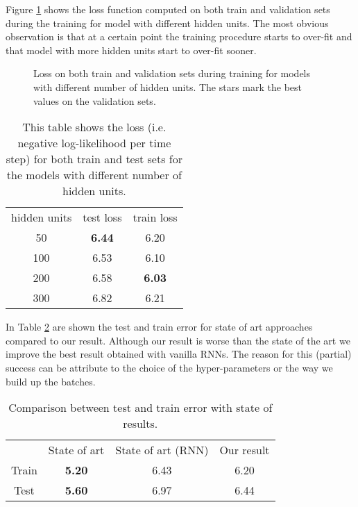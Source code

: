 Figure \ref{fig:overfitting_muse} shows the loss function computed on both train and validation sets during the training for model with different hidden units. The most obvious observation is that at a certain point the training procedure starts to over-fit and that model with more hidden units start to over-fit sooner.

\begin{figure}
	\centering
\resizebox{13cm}{!}{
	
}
\caption{Loss on both train and validation sets during training for models with different number of hidden units. The stars mark the best values on the validation sets.}
\label{fig:overfitting_muse}
\end{figure}

\begin{table}
	\centering
\begin{tabular}{c | c | c}
	hidden units & test loss & train loss \\
	50 & \textbf{6.44} & 6.20  \\
	100 & 6.53 & 6.10 \\
	200 & 6.58 & \textbf{6.03} \\
	300 & 6.82 & 6.21 \\
\end{tabular}
\caption{This table shows the loss (i.e. negative log-likelihood per time step) for both train and test sets for the models with different number of hidden units.}
\label{table:losses_n_hidden}
\end{table}

In Table \ref{table:muse_state_of_art} are shown the test and train error for state of art approaches compared to our result. Although our result is worse than the state of the art we improve the best result obtained with vanilla RNNs. The reason for this (partial) success can be attribute to the choice of the hyper-parameters or the way we build up the batches.

\begin{table}
	\centering
	\begin{tabular}{c | c | c | c}
		& State of art & State of art (RNN) & Our result\\
		Train & \textbf{5.20} & 6.43 & 6.20\\
		Test & \textbf{5.60} & 6.97 & 6.44\\
	\end{tabular}
	\caption{Comparison between test and train error with state of results.}
	\label{table:muse_state_of_art}
	
\end{table}


